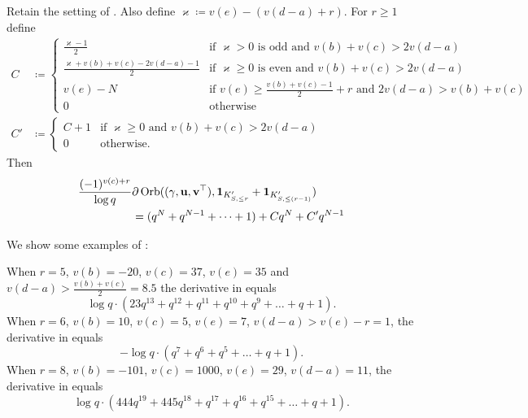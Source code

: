 \begin{corollary}
  \label{cor:semi_lie_combo}
  Retain the setting of .
  Also define $\varkappa \coloneqq v(e) - (v(d-a)+r)$.
  For $r \ge 1$ define
  \begin{align*}
    C &\coloneqq
    \begin{cases}
      \frac{\varkappa-1}{2}
        & \text{if } \varkappa > 0 \text{ is odd}
          \text{ and } v(b) + v(c) > 2v(d-a)  \\
      \frac{\varkappa+v(b)+v(c)-2v(d-a)-1}{2}
        & \text{if } \varkappa \ge 0 \text{ is even}
          \text{ and } v(b) + v(c) > 2v(d-a)  \\
      v(e) - N
        & \text{if } v(e) \ge \frac{v(b)+v(c)-1}{2} + r
        \text{ and } 2v(d-a) > v(b) + v(c) \\
      0 & \text{otherwise}
    \end{cases} \\
    C' &\coloneqq
    \begin{cases}
      C + 1 & \text{if } \varkappa \ge 0 \text{ and } v(b)+v(c) > 2v(d-a) \\
      0 & \text{otherwise}.
    \end{cases}
  \end{align*}
  Then
  \begin{align*}
    \frac{(-1)^{v(c)+r}}{\log q} &
    \partial\operatorname{Orb}({(\gamma, \mathbf u, \mathbf v^\top)}, \mathbf{1}_{K'_{S, \le r}} + \mathbf{1}_{K'_{S, \le (r-1)}}) \\
    &= (q^N + q^{N-1} + \dots + 1) + C q^N + C' q^{N-1}
  \end{align*}
\end{corollary}

\begin{example}
  We show some examples of :
  \begin{itemize}
  \ii When $r=5$, $v(b) = -20$, $v(c) = 37$, $v(e) = 35$ and $v(d-a) > \frac{v(b)+v(c)}{2} = 8.5$
  the derivative in  equals
  \[ \log q \cdot (23q^{13} + q^{12} + q^{11} + q^{10} + q^9 + \dots + q + 1). \]
  \ii When $r = 6$, $v(b) = 10$, $v(c) = 5$, $v(e) = 7$, $v(d-a) > v(e)-r = 1$,
  the derivative in  equals
  \[ -\log q \cdot (q^7 + q^6 + q^5 + \dots + q + 1). \]
  \ii When $r = 8$, $v(b) = -101$, $v(c) = 1000$, $v(e) = 29$, $v(d-a) = 11$,
  the derivative in  equals
  \[ \log q \cdot (444 q^{19} + 445q^{18} + q^{17} + q^{16} + q^{15} + \dots + q + 1). \]
  \end{itemize}
\end{example}

